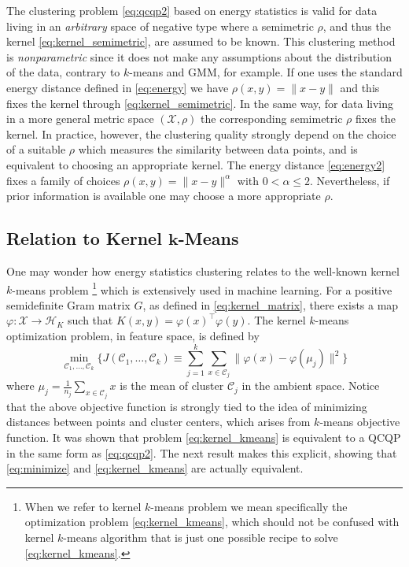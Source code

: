 \documentclass[aps,preprint,nofootinbib,floatfix]{revtex4-1}
\newcommand\kk{K}
\newcommand\HH{\mathcal{H}}
\newcommand\C{{\mathcal{C}}}
\begin{document}

The clustering problem \eqref{eq:qcqp2} based on energy statistics
is valid for data living in an \emph{arbitrary} space of negative type where
a semimetric $\rho$, and thus the kernel \eqref{eq:kernel_semimetric}, are
assumed to be known. This clustering method is
\emph{nonparametric} since it does not make any assumptions
about  the distribution of the data, 
contrary to $k$-means and GMM, for example.
If one uses the standard energy distance
defined in \eqref{eq:energy} 
we have $\rho(x,y) = \| x - y\|$ and this fixes the kernel
through \eqref{eq:kernel_semimetric}. In the same way, 
for data living in a more general
metric space $(\mathcal{X}, \rho)$ the corresponding semimetric $\rho$ fixes
the kernel.
In practice, however,
the clustering quality strongly depend on the choice of a suitable
$\rho$ which measures the similarity between data points,
and is equivalent to choosing an appropriate kernel.
The energy distance \eqref{eq:energy2} fixes a family of choices
$\rho(x,y) = \| x-y\|^\alpha$ with $0 < \alpha\le 2$. 
Nevertheless, if prior information
is available one may choose a more appropriate $\rho$.

\subsection*{Relation to Kernel $\bm{k}$-Means}
One may wonder how energy statistics clustering 
relates to the well-known kernel $k$-means problem%
\footnote{When we refer to kernel $k$-means problem we mean specifically 
the optimization problem \eqref{eq:kernel_kmeans}, which should not be 
confused with kernel $k$-means algorithm that is just one possible recipe 
to solve \eqref{eq:kernel_kmeans}.
} 
which is extensively used in machine learning.
For a positive semidefinite Gram matrix $G$, as defined in
\eqref{eq:kernel_matrix},
there exists a map
$\varphi: \mathcal{X} \to \HH_\kk$ such that
$\kk(x,y) = \varphi(x)^\top \varphi(y)$. The kernel $k$-means optimization
problem,
in feature space,
is defined by
\begin{equation}
\label{eq:kernel_kmeans}
\min_{\C_1,\dotsc,\C_k}\bigg\{ 
J(\C_1,\dots,\C_k) \equiv  \sum_{j=1}^k
\sum_{x \in \C_j} \| \varphi(x) - \varphi(\mu_j) \|^2
\bigg\}
\end{equation}
where $\mu_j = \tfrac{1}{n_j} \sum_{x \in \C_j} x$ is the  mean of cluster
$\C_j$ in the ambient space. Notice that the above objective function
is strongly tied to the idea of minimizing distances between points
and cluster centers, which arises from $k$-means objective function.
It was shown \cite{Dhillon2,Dhillon} 
that problem \eqref{eq:kernel_kmeans} 
is equivalent to a QCQP in the same form as
\eqref{eq:qcqp2}. The next result makes this explicit, showing that
\eqref{eq:minimize} and \eqref{eq:kernel_kmeans} are actually equivalent.
\end{document}
